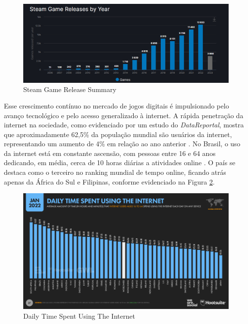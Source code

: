 \begin{figure}[H]
	\centering
	\includegraphics[scale=0.55]{./imagens/introducao/games_release_by_year.png}
	\caption{Steam Game Release Summary}
	\label{GameReleaseYear}
\end{figure}

Esse crescimento contínuo no mercado de jogos digitais é impulsionado pelo avanço tecnológico e pelo acesso generalizado à internet. A rápida penetração da internet na sociedade, como evidenciado por um estudo do \textit{\gls{DataReportal}}, mostra que aproximadamente 62,5\% da população mundial são usuários da internet, representando um aumento de 4\% em relação ao ano anterior \cite{digital_2022_global_overview_report}. No Brasil, o uso da internet está em constante ascensão, com pessoas entre 16 e 64 anos dedicando, em média, cerca de 10 horas diárias a atividades online \cite{digital_2022_global_overview_report}. O país se destaca como o terceiro no ranking mundial de tempo online, ficando atrás apenas da África do Sul e Filipinas, conforme evidenciado na Figura \ref{DailyTime}.

\begin{figure}[H]
	\centering
	\includegraphics[scale=0.4]{imagens/introducao/daily_time_internet.png}
	\caption{Daily Time Spent Using The Internet}
	\label{DailyTime}
\end{figure}

